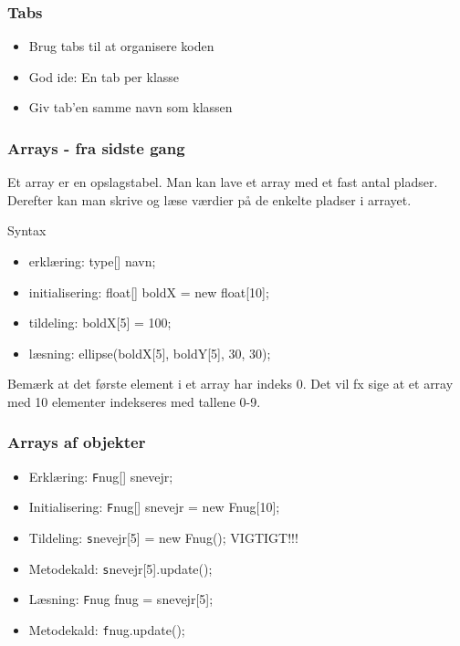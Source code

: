 \documentclass{beamer}
\begin{document}
\begin{frame}[fragile]
  \frametitle{Tabs}
  
  \begin{itemize}
  \item{Brug tabs til at organisere koden}
  \item{God ide: En tab per klasse}
  \item{Giv tab'en samme navn som klassen}
  \end{itemize}
  
\end{frame}


\begin{frame}[fragile]
  \frametitle{Arrays - fra sidste gang}
  
  Et array er en opslagstabel. Man kan lave et array med et fast antal pladser.
  Derefter kan man skrive og læse værdier på de enkelte pladser i arrayet.
  
  \begin{block}{Syntax}
  \begin{itemize}
  \item erklæring: type[] navn;
  \item initialisering: float[] boldX = new float[10];
  \item tildeling: boldX[5] = 100; 
  \item læsning: ellipse(boldX[5], boldY[5], 30, 30);
  \end{itemize}
  \end{block}
  
  Bemærk at det første element i et array har indeks 0. Det vil fx sige at et array med 10 elementer indekseres med tallene 0-9.
\end{frame}


\begin{frame}[fragile]
  \frametitle{Arrays af objekter}
  
  \begin{itemize}
  \item Erklæring:  {\texttt Fnug[] snevejr;}
  \item Initialisering:  {\texttt Fnug[] snevejr = new Fnug[10];}
  \item Tildeling:  {\texttt snevejr[5] = new Fnug();} VIGTIGT!!!
  \item Metodekald:  {\texttt snevejr[5].update(); }  
  \item Læsning:  {\texttt Fnug fnug = snevejr[5];}
  \item Metodekald:  {\texttt fnug.update(); }
  \end{itemize}
  
\end{frame}
\end{document}
